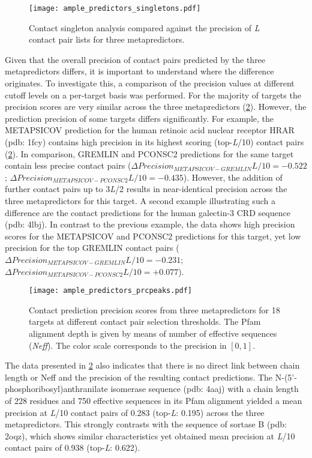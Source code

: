 \begin{figure}[H]
    \centering
    \texttt{[image: ample\_predictors\_singletons.pdf]}
    \caption{Contact singleton analysis compared against the precision of \textit{L} contact pair lists for three metapredictors.}
    \label{fig:ample_predictors_singletons}
\end{figure}

Given that the overall precision of contact pairs predicted by the three metapredictors differs, it is important to understand where the difference originates. To investigate this, a comparison of the precision values at different cutoff levels on a per-target basis was performed. For the majority of targets the precision scores are very similar across the three metapredictors (\cref{fig:ample_predictors_prcpeaks}). However, the prediction precision of some targets differs significantly. For example, the METAPSICOV prediction for the human retinoic acid nuclear receptor HRAR (\gls{pdb}: 1fcy) contains high precision in its highest scoring (top-\textit{L}/10) contact pairs (\cref{fig:ample_predictors_prcpeaks}). In comparison, GREMLIN and PCONSC2 predictions for the same target contain less precise contact pairs ($\Delta Precision_{METAPSICOV-GREMLIN} L/10=-0.522$; $\Delta Precision_{METAPSICOV-PCONSC2} L/10=-0.435$). However, the addition of further contact pairs up to 3\textit{L}/2 results in near-identical precision across the three metapredictors for this target. A second example illustrating such a difference are the contact predictions for the human galectin-3 CRD sequence (\gls{pdb}: 4lbj). In contrast to the previous example, the data shows high precision scores for the METAPSICOV and PCONSC2 predictions for this target, yet low precision for the top GREMLIN contact pairs ($\Delta Precision_{METAPSICOV-GREMLIN} L/10=-0.231$; $\Delta Precision_{METAPSICOV-PCONSC2} L/10=+0.077$). 

\begin{figure}[H]
    \centering
    \texttt{[image: ample\_predictors\_prcpeaks.pdf]}
    \caption{Contact prediction precision scores from three metapredictors for 18 targets at different contact pair selection thresholds. The Pfam alignment depth is given by means of number of effective sequences (\textit{Neff}). The color scale corresponds to the precision in $[0, 1]$.}
    \label{fig:ample_predictors_prcpeaks}
\end{figure}

The data presented in \cref{fig:ample_predictors_prcpeaks} also indicates that there is no direct link between chain length or Neff and the precision of the resulting contact predictions. The N-(5'-phosphoribosyl)anthranilate isomerase sequence (\gls{pdb}: 4aaj) with a chain length of 228 residues and 750 effective sequences in its Pfam alignment yielded a mean precision at \textit{L}/10 contact pairs of 0.283 (top-\textit{L}: 0.195) across the three metapredictors. This strongly contrasts with the sequence of sortase B (\gls{pdb}: 2oqz), which shows similar characteristics yet obtained  mean precision at \textit{L}/10 contact pairs of 0.938 (top-\textit{L}: 0.622).

